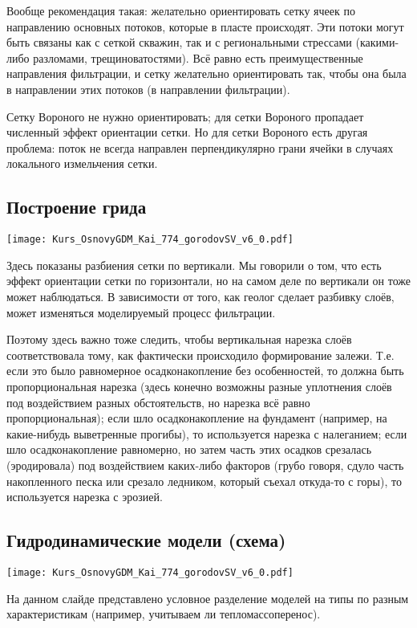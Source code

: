 \documentclass[main.tex]{subfiles}
\begin{document}
Вообще рекомендация такая: желательно ориентировать сетку ячеек по направлению основных потоков, которые в пласте происходят.
Эти потоки могут быть связаны как с сеткой скважин, так и с региональными стрессами (какими-либо разломами, трещиноватостями). Всё равно есть преимущественные направления фильтрации, и сетку желательно ориентировать так, чтобы она была в направлении этих потоков (в направлении фильтрации).

Сетку Вороного не нужно ориентировать; для сетки Вороного пропадает численный эффект ориентации сетки.
Но для сетки Вороного есть другая проблема: поток не всегда направлен перпендикулярно грани ячейки в случаях локального измельчения сетки.

\subsection{Построение грида}

\texttt{[image: Kurs\_OsnovyGDM\_Kai\_774\_gorodovSV\_v6\_0.pdf]}

Здесь показаны разбиения сетки по вертикали.
Мы говорили о том, что есть эффект ориентации сетки по горизонтали, но на самом деле по вертикали он тоже может наблюдаться. В зависимости от того, как геолог сделает разбивку слоёв, может изменяться моделируемый процесс фильтрации.

Поэтому здесь важно тоже следить, чтобы вертикальная нарезка слоёв соответствовала тому, как фактически происходило формирование залежи.
Т.е. если это было равномерное осадконакопление без особенностей, то должна быть пропорциональная нарезка (здесь конечно возможны разные уплотнения слоёв под воздействием разных обстоятельств, но нарезка всё равно пропорциональная); если шло осадконакопление на фундамент (например, на какие-нибудь выветренные прогибы), то используется нарезка с налеганием; если шло осадконакопление равномерно, но затем часть этих осадков срезалась (эродировала) под воздействием каких-либо факторов (грубо говоря, сдуло часть накопленного песка или срезало ледником, который съехал откуда-то с горы), то используется нарезка с эрозией.

\subsection{Гидродинамические модели (схема)}

\texttt{[image: Kurs\_OsnovyGDM\_Kai\_774\_gorodovSV\_v6\_0.pdf]}

На данном слайде представлено условное разделение моделей на типы по разным характеристикам (например, учитываем ли тепломассоперенос).
\end{document}
